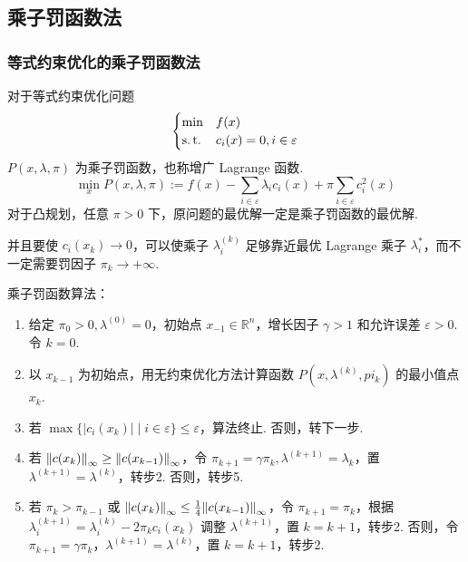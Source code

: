 \subsection{乘子罚函数法}
\subsubsection{等式约束优化的乘子罚函数法}
\begin{note}
    对于等式约束优化问题\[\begin{cases}
        \min &f(x)\\
        \operatorname{s.t.} &c_i(x) = 0, i \in \varepsilon    
    \end{cases}\]
    $P(x, \lambda, \pi)$ 为乘子罚函数，也称增广 Lagrange 函数.
    \[\min_xP(x, \lambda, \pi) := f(x) - \sum_{i \in \varepsilon}\lambda_ic_i(x) + \pi\sum_{i \in \varepsilon}c_i^2(x)\]
    对于凸规划，任意 $\pi > 0$ 下，原问题的最优解一定是乘子罚函数的最优解.

    并且要使 $c_i(x_k) \to 0$，可以使乘子 $\lambda_i^{(k)}$ 足够靠近最优 Lagrange 乘子 $\lambda_i^*$，而不一定需要罚因子 $\pi_k \to +\infty$.
\end{note}

\begin{note}
    乘子罚函数算法：\begin{enumerate}
        \item 给定 $\pi_0 > 0, \lambda^{(0)} = 0$，初始点 $x_{-1} \in \mathbb{R}^n$，增长因子 $\gamma > 1$ 和允许误差 $\varepsilon > 0$. 令 $k = 0$.
        \item 以 $x_{k - 1}$ 为初始点，用无约束优化方法计算函数 $P(x, \lambda^{(k)}, pi_k)$ 的最小值点 $x_k$.
        \item 若 $\max\{|c_i(x_k)| \mid i \in \varepsilon\} \le \varepsilon$，算法终止. 否则，转下一步.
        \item 若 $\norm{c(x_k)}_\infty \ge \norm{c(x_{k - 1})}_\infty$，令 $\pi_{k + 1} = \gamma \pi_k, \lambda^{(k + 1)} = \lambda_k$，置 $\lambda^{(k + 1)} = \lambda^{(k)}$，转步2. 否则，转步5.
        \item 若 $\pi_k > \pi_{k - 1}$ 或 $\norm{c(x_k)}_\infty \le \frac{1}{4}\norm{c(x_{k - 1})}_\infty$，令 $\pi_{k + 1} = \pi_k$，根据 $\lambda_i^{(k + 1)} = \lambda_i^{(k)} - 2\pi_kc_i(x_k)$ 调整 $\lambda^{(k + 1)}$，置 $k = k + 1$，转步2. 否则，令 $\pi_{k + 1} = \gamma \pi_k$，$\lambda^{(k + 1)} = \lambda^{(k)}$，置 $k = k + 1$，转步2.
    \end{enumerate}
\end{note}





